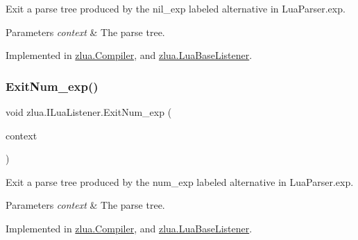 Exit a parse tree produced by the {\ttfamily nil\+\_\+exp} labeled alternative in Lua\+Parser.\+exp. 


\begin{DoxyParams}{Parameters}
{\em context} & The parse tree.\\
\hline
\end{DoxyParams}


Implemented in \mbox{\hyperlink{classzlua_1_1_compiler_a1ec231e95547be0d28e8d1f30f4872ba}{zlua.\+Compiler}}, and \mbox{\hyperlink{classzlua_1_1_lua_base_listener_a997d90f5a6a982d2bf09d4d2f249908f}{zlua.\+Lua\+Base\+Listener}}.

\mbox{\label{interfacezlua_1_1_i_lua_listener_ae345a5af97b04861ba3ce16cf1e33808}} 
\subsubsection{\texorpdfstring{Exit\+Num\+\_\+exp()}{ExitNum\_exp()}}
{\footnotesize\ttfamily void zlua.\+I\+Lua\+Listener.\+Exit\+Num\+\_\+exp (\begin{DoxyParamCaption}\item[{\mbox{[}\+Not\+Null\mbox{]} \mbox{\hyperlink{classzlua_1_1_lua_parser_1_1_num__exp_context}{Lua\+Parser.\+Num\+\_\+exp\+Context}}}]{context }\end{DoxyParamCaption})}



Exit a parse tree produced by the {\ttfamily num\+\_\+exp} labeled alternative in Lua\+Parser.\+exp. 


\begin{DoxyParams}{Parameters}
{\em context} & The parse tree.\\
\hline
\end{DoxyParams}


Implemented in \mbox{\hyperlink{classzlua_1_1_compiler_a3a76d8ff765978e61655469c1277c65e}{zlua.\+Compiler}}, and \mbox{\hyperlink{classzlua_1_1_lua_base_listener_a450c13a6c541dd5eed0c0713fdf81343}{zlua.\+Lua\+Base\+Listener}}.

\mbox{\label{interfacezlua_1_1_i_lua_listener_a3c6fb2edc82e8e12e51ea539d512762b}} 
